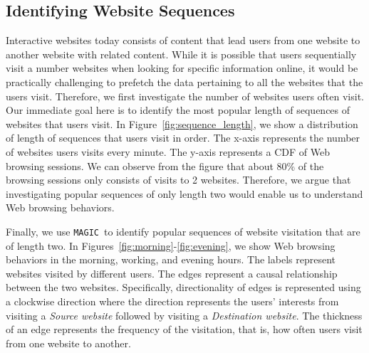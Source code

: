 \documentclass[letterpaper,twocolumn]{article}
\newcommand{\sol}{\texttt{MAGIC}}
\begin{document}
 
\vspace{-12pt}
\subsection{Identifying Website Sequences}
\vspace{-10pt}

Interactive websites today consists of content that lead users from one website to another website with related content.
While it is possible that users sequentially visit a number websites when looking for specific information online, it would be practically challenging to prefetch the data pertaining to all the websites that the users visit.
Therefore, we first investigate the number of websites users often visit.
Our immediate goal here is to identify the most popular length of sequences of websites that users visit.
In Figure~\ref{fig:sequence_length}, we show a distribution of length of sequences that users visit in order.
The x-axis represents the number of websites users visits every minute.
The y-axis represents a CDF of Web browsing sessions.
We can observe from the figure that about 80\% of the browsing sessions only consists of visits to 2 websites.
Therefore, we argue that investigating popular sequences of only length two would enable us to understand Web browsing behaviors.

Finally, we use \sol\ to identify popular sequences of website visitation that are of length two.
In Figures~\ref{fig:morning}-\ref{fig:evening}, we show Web browsing behaviors in the morning, working, and evening hours. 
The labels represent websites visited by different users.
The edges represent a causal relationship between the two websites.
Specifically, directionality of edges is represented using a clockwise direction where the direction represents the users' interests from visiting a \textit{Source website} followed by visiting a \textit{Destination website}.
The thickness of an edge represents the frequency of the visitation, that is, how often users visit from one website to another.
\end{document}

